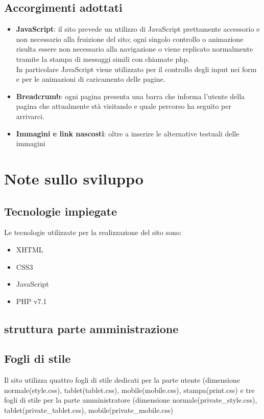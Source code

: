 \documentclass[a4paper,12pt]{article}
\begin{document}
\subsection{Accorgimenti adottati}
\begin{itemize}
	\item \textbf{JavaScript}: il sito prevede un utilizzo di JavaScript prettamente accessorio e non necessario alla fruizione del sito; ogni singolo controllo o animazione risulta essere non necessario alla navigazione o viene replicato normalmente tramite la stampa di messaggi simili con chiamate php.\\
	In particolare JavaScript viene utilizzato per il controllo degli input nei form e per le animazioni di caricamento delle pagine.
	\item \textbf{Breadcrumb}: ogni pagina presenta una barra che informa l'utente della pagina che attualmente stà visitando e quale percorso ha seguito per arrivarci.
	\item \textbf{Immagini e link nascosti}: oltre a inserire le alternative testuali delle immagini 
\end{itemize}
\section{Note sullo sviluppo}
\subsection{Tecnologie impiegate}
Le tecnologie utilizzate per la realizzazione del sito sono:
\begin{itemize}
	\item XHTML
	\item CSS3
	\item JavaScript
	\item PHP v7.1
\end{itemize}
\subsection{struttura parte amministrazione}
\subsection{Fogli di stile}
Il sito utilizza quattro fogli di stile dedicati per la parte utente (dimensione normale(style.css), tablet(tablet.css), mobile(mobile.css), stampa(print.css) e tre fogli di stile per la parte amministratore (dimensione normale(private\_style.css), tablet(private\_tablet.css), mobile(private\_mobile.css)
\end{document}

